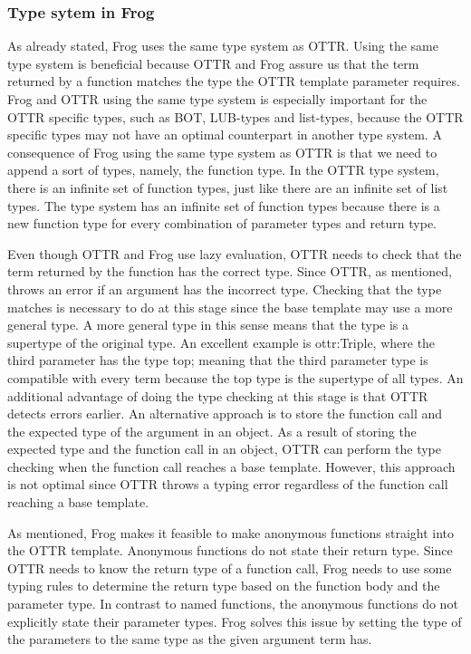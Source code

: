 \subsubsection{Type sytem in Frog}
\label{types in frog}
As already stated, Frog uses the same type system as OTTR. Using the same type system is beneficial because OTTR and Frog assure us that the term returned by a function matches the type the OTTR template parameter requires. Frog and OTTR using the same type system is especially important for the OTTR specific types, such as BOT, LUB-types and list-types, because the OTTR specific types may not have an optimal counterpart in another type system. A consequence of Frog using the same type system as OTTR is that we need to append a sort of types, namely, the function type.  In the OTTR type system, there is an infinite set of function types, just like there are an infinite set of list types. The type system has an infinite set of function types because there is a new function type for every combination of parameter types and return type. 

\para
Even though OTTR and Frog use lazy evaluation, OTTR needs to check that the term returned by the function has the correct type. Since OTTR, as mentioned, throws an error if an argument has the incorrect type. Checking that the type matches is necessary to do at this stage since the base template may use a more general type. A more general type in this sense means that the type is a supertype of the original type. An excellent example is ottr:Triple, where the third parameter has the type top; meaning that the third parameter type is compatible with every term because the top type is the supertype of all types. An additional advantage of doing the type checking at this stage is that OTTR detects errors earlier. An alternative approach is to store the function call and the expected type of the argument in an object. As a result of storing the expected type and the function call in an object, OTTR can perform the type checking when the function call reaches a base template. However, this approach is not optimal since OTTR throws a typing error regardless of the function call reaching a base template. 

\para 
As mentioned, Frog makes it feasible to make anonymous functions straight into the OTTR template. Anonymous functions do not state their return type. Since OTTR needs to know the return type of a function call, Frog needs to use some typing rules to determine the return type based on the function body and the parameter type. In contrast to named functions, the anonymous functions do not explicitly state their parameter types. Frog solves this issue by setting the type of the parameters to the same type as the given argument term has. 

